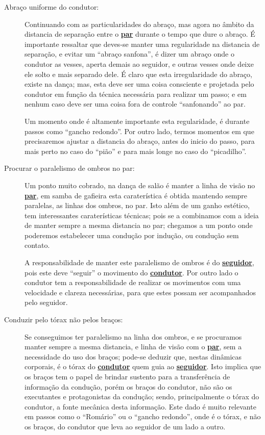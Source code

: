 \begin{description}
\item[Abraço uniforme do condutor:] Continuando com as particularidades do abraço,
mas agora no âmbito da distancia de separação entre o \hyperref[def:Par]{\textbf{par}} durante o tempo que dure o abraço.
É importante ressaltar que deves-se manter uma regularidade na distancia de separação,
e evitar um ``abraço sanfona'', é dizer um abraço onde o condutor as vesses, 
aperta demais ao seguidor, e outras vesses onde deixe ele solto e mais separado dele.
É claro que esta irregularidade do abraço, existe na dança; 
mas, esta deve ser uma coisa consciente e projetada 
pelo condutor em função da técnica necessária para realizar um passo; 
e em nenhum caso deve ser uma coisa  fora de controle ``sanfonando'' ao par.

Um momento onde é altamente importante esta regularidade, 
é durante passos como ``gancho redondo''.
Por outro lado, termos momentos em que precisaremos ajustar a distancia do abraço,
antes do inicio do passo, para mais perto no caso do ``pião'' e para mais longe no caso do ``picadilho''.

\item[Procurar o paralelismo de ombros no par:] 
Um ponto muito cobrado, na dança de salão é manter a linha de visão no \hyperref[def:Par]{\textbf{par}},
em samba de gafieira esta caraterística é obtida mantendo sempre paralelas, as linhas dos ombros, no par.
Isto além de um ganho estético, tem interessantes caraterísticas técnicas;
pois se a combinamos com a ideia de manter sempre a mesma distancia no par;
chegamos a um ponto onde poderemos estabelecer uma condução por indução, ou condução sem contato.

A responsabilidade de manter este paralelismo de ombros é do \hyperref[def:Seguidor]{\textbf{seguidor}},
pois este deve ``seguir'' o movimento do \hyperref[def:Condutor]{\textbf{condutor}}.
Por outro lado o condutor tem a responsabilidade de realizar os movimentos com uma velocidade e clareza necessárias, 
para que estes possam ser acompanhados pelo seguidor.

\item[Conduzir pelo tórax não pelos braços:] 
Se conseguimos ter paralelismo na linha dos ombros,
e se procuramos manter sempre a mesma distancia, 
e linha de visão com o \hyperref[def:Par]{\textbf{par}}, 
sem a necessidade do uso dos braços;
pode-se deduzir que, nestas dinâmicas corporais,
é o tórax do \hyperref[def:Condutor]{\textbf{condutor}} quem guia ao \hyperref[def:Seguidor]{\textbf{seguidor}}.
Isto implica que os braços tem o papel de brindar sustento para a transferência de informação da condução,
porém os braços do condutor, não são os executantes e protagonistas da condução;
sendo, principalmente o tórax do condutor, a fonte mecânica desta informação.
Este dado é muito relevante em passos como o ``Romário'' ou o ``gancho redondo'',
onde é o tórax, e não os braços, do condutor que leva ao seguidor de um lado a outro. 


\end{description}
